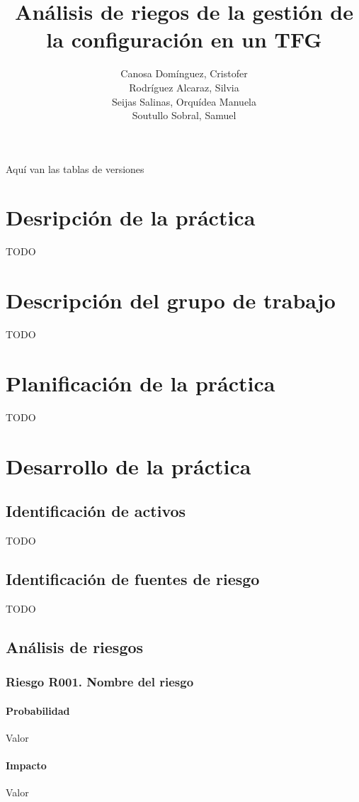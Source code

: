 \documentclass[10pt,a4paper]{article}
\author{Canosa Domínguez, Cristofer \\ Rodríguez Alcaraz, Silvia \\ Seijas Salinas, Orquídea Manuela \\ Soutullo Sobral, Samuel}
\title{Análisis de riegos de la gestión de la configuración en un TFG}
\begin{document}
	\maketitle %
	\newpage
	
	Aquí van las tablas de versiones %
	
	\newpage
	\tableofcontents
	\newpage
	
	\section{Desripción de la práctica}
		TODO %
		
	\section{Descripción del grupo de trabajo}
		TODO %
		
	\section{Planificación de la práctica}
		TODO %
		
	\section{Desarrollo de la práctica}
		\subsection{Identificación de activos}
			TODO %
			
		\subsection{Identificación de fuentes de riesgo}
			TODO %
			
		\subsection{Análisis de riesgos}
			\subsubsection{Riesgo R001. Nombre del riesgo}
				\paragraph{Probabilidad} Valor
				\paragraph{Impacto}	Valor
\end{document}
